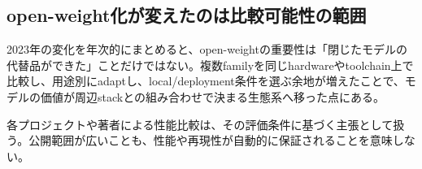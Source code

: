 \subsection{open-weight化が変えたのは比較可能性の範囲}

2023年の変化を年次的にまとめると、open-weightの重要性は「閉じたモデルの代替品ができた」ことだけではない。複数familyを同じhardwareやtoolchain上で比較し、用途別にadaptし、local/deployment条件を選ぶ余地が増えたことで、モデルの価値が周辺stackとの組み合わせで決まる生態系へ移った点にある。\autocite{src-00c370ab2324,src-1fd43f93adcc,src-240ca564b6b8,src-3db09fede330,src-5c8e2db8871a,src-74aa7e2a7ca4,src-81f670ec1e74,src-8bdb904686fb,src-9df482e2c96c,src-b7e5243e6d59,src-bc7aba201f01,src-d4b6359bbad1,src-dd2cfa98160d,src-f0349196879e}


\begin{claimboundary}
各プロジェクトや著者による性能比較は、その評価条件に基づく主張として扱う。公開範囲が広いことも、性能や再現性が自動的に保証されることを意味しない。\autocite{src-240ca564b6b8,src-3db09fede330,src-8bdb904686fb,src-9df482e2c96c,src-b7e5243e6d59,src-bc7aba201f01}
\end{claimboundary}
